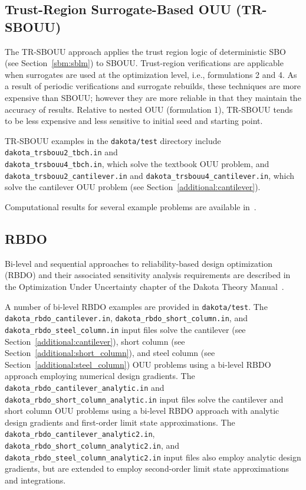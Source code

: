 \subsection{Trust-Region Surrogate-Based OUU (TR-SBOUU)}\label{adv_models:ouu:trsb}

The TR-SBOUU approach applies the trust region logic of deterministic
SBO (see Section~\ref{sbm:sblm}) to SBOUU. Trust-region verifications
are applicable when surrogates are used at the optimization level,
i.e., formulations 2 and 4. As a result of periodic verifications and
surrogate rebuilds, these techniques are more expensive than SBOUU;
however they are more reliable in that they maintain the accuracy of
results. Relative to nested OUU (formulation 1), TR-SBOUU tends to be
less expensive and less sensitive to initial seed and starting point.

TR-SBOUU examples in the \texttt{dakota/test} directory include
\texttt{dakota\_trsbouu2\_tbch.in} and\\
\texttt{dakota\_trsbouu4\_tbch.in}, which solve the textbook OUU
problem, and\\ \texttt{dakota\_trsbouu2\_cantilever.in} and
\texttt{dakota\_trsbouu4\_cantilever.in}, which solve the cantilever
OUU problem (see Section~\ref{additional:cantilever}).

Computational results for several example problems are available
in~\cite{Eld02}.

\subsection{RBDO} \label{adv_models:ouu:rbdo}

Bi-level and sequential approaches to reliability-based design
optimization (RBDO) and their associated sensitivity analysis
requirements are described in the Optimization Under Uncertainty
chapter of the Dakota Theory Manual~\cite{TheoMan}.

A number of bi-level RBDO examples are provided in \texttt{dakota/test}.
The \texttt{dakota\_rbdo\_cantilever.in},
\texttt{dakota\_rbdo\_short\_column.in}, and
\texttt{dakota\_rbdo\_steel\_column.in} input files solve the
cantilever (see Section~\ref{additional:cantilever}), short column
(see Section~\ref{additional:short_column}), and steel column (see
Section~\ref{additional:steel_column}) OUU problems using a bi-level
RBDO approach employing numerical design gradients.  The 
\texttt{dakota\_rbdo\_cantilever\_analytic.in} and
\texttt{dakota\_rbdo\_short\_column\_analytic.in} input files solve
the cantilever and short column OUU problems using a bi-level RBDO
approach with analytic design gradients and first-order limit state
approximations.  The \texttt{dakota\_rbdo\_cantilever\_analytic2.in},
\texttt{dakota\_rbdo\_short\_column\_analytic2.in}, and
\texttt{dakota\_rbdo\_steel\_column\_analytic2.in} input files also
employ analytic design gradients, but are extended to employ
second-order limit state approximations and integrations.

